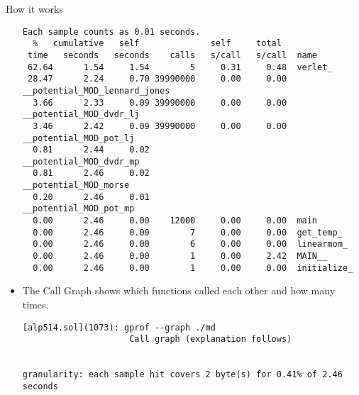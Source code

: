 \documentclass[10pt,t]{beamer}
\begin{document}
\begin{frame}{How it works}
\begin{itemize}
\begin{lstlisting}
Each sample counts as 0.01 seconds.
  %   cumulative   self              self     total
 time   seconds   seconds    calls   s/call   s/call  name
 62.64      1.54     1.54        5     0.31     0.48  verlet_
 28.47      2.24     0.70 39990000     0.00     0.00  __potential_MOD_lennard_jones
  3.66      2.33     0.09 39990000     0.00     0.00  __potential_MOD_dvdr_lj
  3.46      2.42     0.09 39990000     0.00     0.00  __potential_MOD_pot_lj
  0.81      2.44     0.02                             __potential_MOD_dvdr_mp
  0.81      2.46     0.02                             __potential_MOD_morse
  0.20      2.46     0.01                             __potential_MOD_pot_mp
  0.00      2.46     0.00    12000     0.00     0.00  main
  0.00      2.46     0.00        7     0.00     0.00  get_temp_
  0.00      2.46     0.00        6     0.00     0.00  linearmom_
  0.00      2.46     0.00        1     0.00     2.42  MAIN__
  0.00      2.46     0.00        1     0.00     0.00  initialize_
      \end{lstlisting}
      \framebreak
    \item The Call Graph shows which functions called each other and how many times.
      \begin{lstlisting}
[alp514.sol](1073): gprof --graph ./md
                     Call graph (explanation follows)


granularity: each sample hit covers 2 byte(s) for 0.41% of 2.46 seconds


\end{lstlisting}
\end{itemize}
\end{frame}
\end{document}
